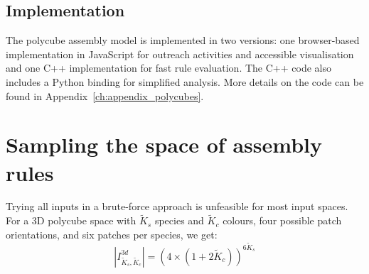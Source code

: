 \subsection{Implementation}

The polycube assembly model is implemented in two versions: one browser-based implementation in JavaScript for outreach activities and accessible visualisation and one C++ implementation for fast rule evaluation. The C++ code also includes a Python binding for simplified analysis. More details on the code can be found in Appendix~\ref{ch:appendix_polycubes}.




\section{Sampling the space of assembly rules}
Trying all inputs in a brute-force approach is unfeasible for most input spaces. For a 3D polycube space with \(\widetilde{K}_s\) species and \(\widetilde{K}_c\) colours, four possible patch orientations, and six patches per species, we get: 
\[
\left\lvert I_{\widetilde{K}_s, \widetilde{K}_c}^{3d}\right\rvert = (4 \times (1+2\widetilde{K}_c))^{6\widetilde{K}_s}
\]

